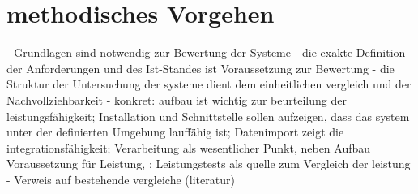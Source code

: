 \chapter{methodisches Vorgehen}

- Grundlagen sind notwendig zur Bewertung der Systeme
- die exakte Definition der Anforderungen und des Ist-Standes ist Voraussetzung zur Bewertung
- die Struktur der Untersuchung der systeme dient dem einheitlichen vergleich und der Nachvollziehbarkeit
- konkret: aufbau ist wichtig  zur beurteilung der leistungsfähigkeit; Installation und Schnittstelle sollen aufzeigen, dass das system unter der definierten Umgebung lauffähig ist; Datenimport zeigt die integrationsfähigkeit; Verarbeitung als wesentlicher Punkt, neben Aufbau Voraussetzung für Leistung, ; Leistungstests als quelle zum Vergleich der leistung
- Verweis auf bestehende vergleiche (literatur)
